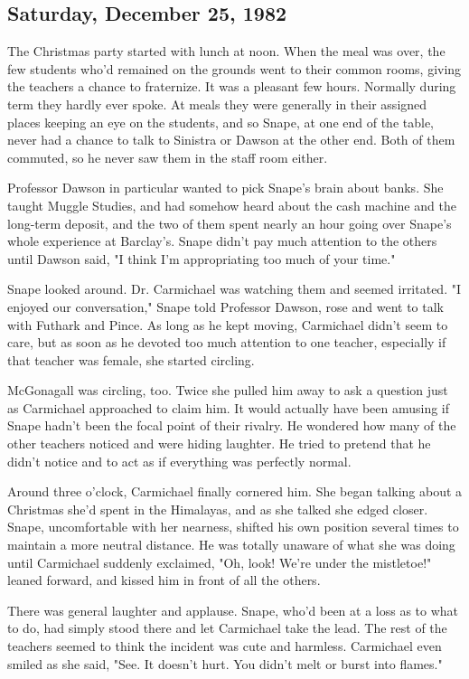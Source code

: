 \documentclass[a4paper,11pt]{article}
\begin{document}
\subsection{Saturday, December 25, 1982}

The Christmas party started with lunch at noon. When the meal was over, the few students who'd remained on the grounds went to their common rooms, giving the teachers a chance to fraternize. It was a pleasant few hours. Normally during term they hardly ever spoke. At meals they were generally in their assigned places keeping an eye on the students, and so Snape, at one end of the table, never had a chance to talk to Sinistra or Dawson at the other end. Both of them commuted, so he never saw them in the staff room either.

Professor Dawson in particular wanted to pick Snape's brain about banks. She taught Muggle Studies, and had somehow heard about the cash machine and the long-term deposit, and the two of them spent nearly an hour going over Snape's whole experience at Barclay's. Snape didn't pay much attention to the others until Dawson said, "I think I'm appropriating too much of your time."

Snape looked around. Dr. Carmichael was watching them and seemed irritated. "I enjoyed our conversation," Snape told Professor Dawson, rose and went to talk with Futhark and Pince. As long as he kept moving, Carmichael didn't seem to care, but as soon as he devoted too much attention to one teacher, especially if that teacher was female, she started circling.

McGonagall was circling, too. Twice she pulled him away to ask a question just as Carmichael approached to claim him. It would actually have been amusing if Snape hadn't been the focal point of their rivalry. He wondered how many of the other teachers noticed and were hiding laughter. He tried to pretend that he didn't notice and to act as if everything was perfectly normal.

Around three o'clock, Carmichael finally cornered him. She began talking about a Christmas she'd spent in the Himalayas, and as she talked she edged closer. Snape, uncomfortable with her nearness, shifted his own position several times to maintain a more neutral distance. He was totally unaware of what she was doing until Carmichael suddenly exclaimed, "Oh, look! We're under the mistletoe!" leaned forward, and kissed him in front of all the others.

There was general laughter and applause. Snape, who'd been at a loss as to what to do, had simply stood there and let Carmichael take the lead. The rest of the teachers seemed to think the incident was cute and harmless. Carmichael even smiled as she said, "See. It doesn't hurt. You didn't melt or burst into flames."
\end{document}
